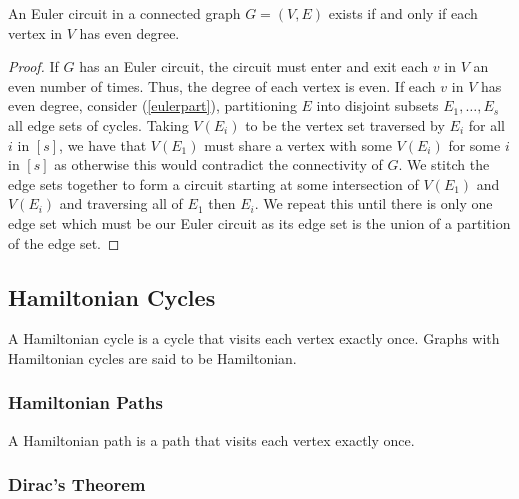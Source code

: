An Euler circuit in a connected graph $G = (V, E)$ exists if and only 
if each vertex in $V$ has even degree.
\begin{proof}
    If $G$ has an Euler circuit, the circuit must enter and exit each $v$
    in $V$ an even number of times. Thus, the degree of each vertex is even.
    If each $v$ in $V$ has even degree, consider (\ref{eulerpart}), partitioning
    $E$ into disjoint subsets $E_1, \ldots, E_s$ all edge sets of cycles.
    Taking $V(E_i)$ to be the vertex set traversed by $E_i$ for all $i$ in $[s]$,
    we have that $V(E_1)$ must share a vertex with some $V(E_i)$ for some $i$ in $[s]$
    as otherwise this would contradict the connectivity of $G$.
    We stitch the edge sets together to form a circuit starting at some
    intersection of $V(E_1)$ and $V(E_i)$ and traversing all of
    $E_1$ then $E_i$. We repeat this until there is only one edge set
    which must be our Euler circuit as its edge set is the union of a
    partition of the edge set.
\end{proof}

\subsection{Hamiltonian Cycles}

A Hamiltonian cycle is a cycle that visits each vertex exactly once.
Graphs with Hamiltonian cycles are said to be Hamiltonian.

\subsubsection{Hamiltonian Paths}

A Hamiltonian path is a path that visits each vertex exactly once.

\subsubsection{Dirac's Theorem}


